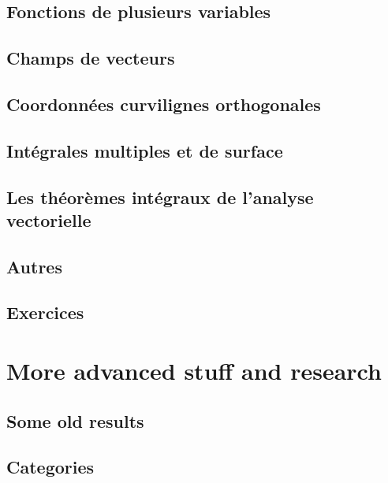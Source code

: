 \chapter{Fonctions de plusieurs variables}


\chapter{Champs de vecteurs}


\chapter{Coordonnées curvilignes orthogonales}


\chapter{Intégrales multiples et de surface}


\chapter{Les théorèmes intégraux de l'analyse vectorielle}


\chapter{Autres}


\chapter{Exercices}




\part{More advanced stuff and research}



\chapter{Some old results}


\chapter{Categories}        \label{chap_category}


